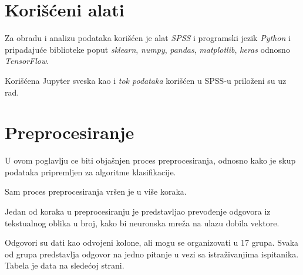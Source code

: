 \documentclass[12pt]{article}
\begin{document}
\section{Korišćeni alati}
Za obradu i analizu podataka korišćen je alat \textit{SPSS} i programski jezik \textit{Python} i pripadajuće biblioteke poput \textit{sklearn}, \textit{numpy}, \textit{pandas}, \textit{matplotlib}, \textit{keras} odnosno \textit{TensorFlow}.

Korišćena Jupyter sveska kao i \textit{tok podataka} korišćen u SPSS-u priloženi su uz rad.

\section{Preprocesiranje}	
\label{sec:preprocesiranje}

U ovom poglavlju ce biti objašnjen proces preprocesiranja, odnosno kako je skup podataka pripremljen za algoritme klasifikacije. 

Sam proces preprocesiranja vršen je u više koraka.

Jedan od koraka u preprocesiranju je predstavljao prevođenje odgovora iz tekstualnog oblika u broj, kako bi neuronska mreža na ulazu dobila vektore.

Odgovori su dati kao odvojeni kolone, ali mogu se organizovati u 17 grupa. Svaka od grupa predstavlja odgovor na jedno pitanje u vezi sa istraživanjima ispitanika. Tabela je data na sledećoj strani.

\newpage
\end{document}
